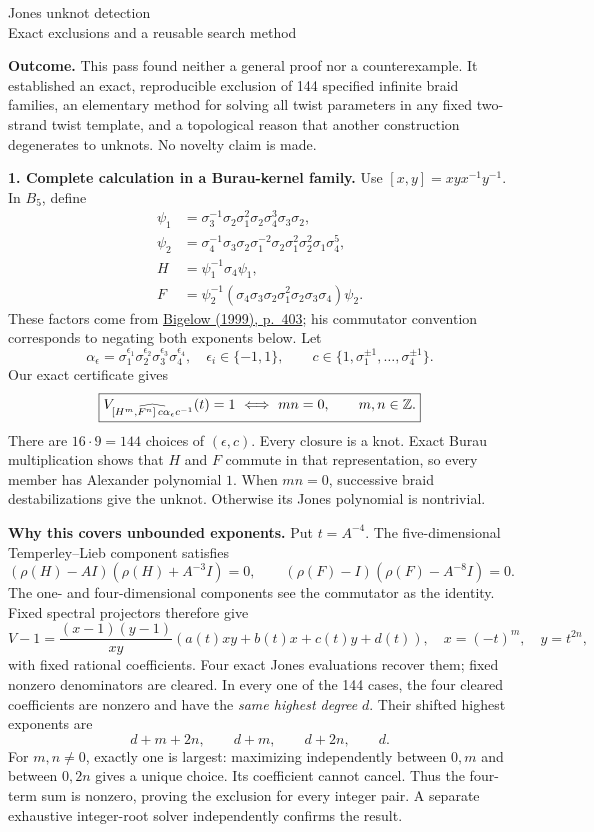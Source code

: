 \documentclass[11pt]{article}
\begin{document}
{\LARGE Jones unknot detection}\\[4pt]
{\large Exact exclusions and a reusable search method}

\textbf{Outcome.} This pass found neither a general proof nor a counterexample. It established an exact, reproducible exclusion of 144 specified infinite braid families, an elementary method for solving all twist parameters in any fixed two-strand twist template, and a topological reason that another construction degenerates to unknots. No novelty claim is made.

\textbf{1. Complete calculation in a Burau-kernel family.}
Use $[x,y]=xyx^{-1}y^{-1}$. In $B_5$, define
\begin{align*}
\psi_1&=\sigma_3^{-1}\sigma_2\sigma_1^2\sigma_2\sigma_4^3\sigma_3\sigma_2,\\
\psi_2&=\sigma_4^{-1}\sigma_3\sigma_2\sigma_1^{-2}\sigma_2\sigma_1^2\sigma_2^2\sigma_1\sigma_4^5,\\
H&=\psi_1^{-1}\sigma_4\psi_1,\\
F&=\psi_2^{-1}(\sigma_4\sigma_3\sigma_2\sigma_1^2\sigma_2\sigma_3\sigma_4)\psi_2 .
\end{align*}
These factors come from \href{https://doi.org/10.2140/gt.1999.3.397}{Bigelow (1999), p.~403}; his commutator convention corresponds to negating both exponents below. Let
\[
\alpha_{\epsilon}=\sigma_1^{\epsilon_1}\sigma_2^{\epsilon_2}
 \sigma_3^{\epsilon_3}\sigma_4^{\epsilon_4},\quad \epsilon_i\in\{-1,1\},
\qquad c\in\{1,\sigma_1^{\pm1},\ldots,\sigma_4^{\pm1}\}.
\]
Our exact certificate gives
\[
\boxed{
V_{\widehat{[H^m,F^n]\,c\alpha_\epsilon c^{-1}}}(t)=1
\ \Longleftrightarrow\ mn=0,\qquad m,n\in\mathbb Z .
}
\]
There are $16\cdot9=144$ choices of $(\epsilon,c)$. Every closure is a knot. Exact Burau multiplication shows that $H$ and $F$ commute in that representation, so every member has Alexander polynomial $1$. When $mn=0$, successive braid destabilizations give the unknot. Otherwise its Jones polynomial is nontrivial.

\textbf{Why this covers unbounded exponents.}
Put $t=A^{-4}$. The five-dimensional Temperley--Lieb component satisfies
\[
(\rho(H)-AI)(\rho(H)+A^{-3}I)=0,\qquad
(\rho(F)-I)(\rho(F)-A^{-8}I)=0.
\]
The one- and four-dimensional components see the commutator as the identity. Fixed spectral projectors therefore give
\[
V-1=\frac{(x-1)(y-1)}{xy}(a(t)xy+b(t)x+c(t)y+d(t)),
\quad x=(-t)^m,\quad y=t^{2n},
\]
with fixed rational coefficients. Four exact Jones evaluations recover them; fixed nonzero denominators are cleared. In every one of the 144 cases, the four cleared coefficients are nonzero and have the \emph{same highest degree} $d$. Their shifted highest exponents are
\[
d+m+2n,\qquad d+m,\qquad d+2n,\qquad d.
\]
For $m,n\ne0$, exactly one is largest: maximizing independently between $0,m$ and between $0,2n$ gives a unique choice. Its coefficient cannot cancel. Thus the four-term sum is nonzero, proving the exclusion for every integer pair. A separate exhaustive integer-root solver independently confirms the result.
\end{document}
